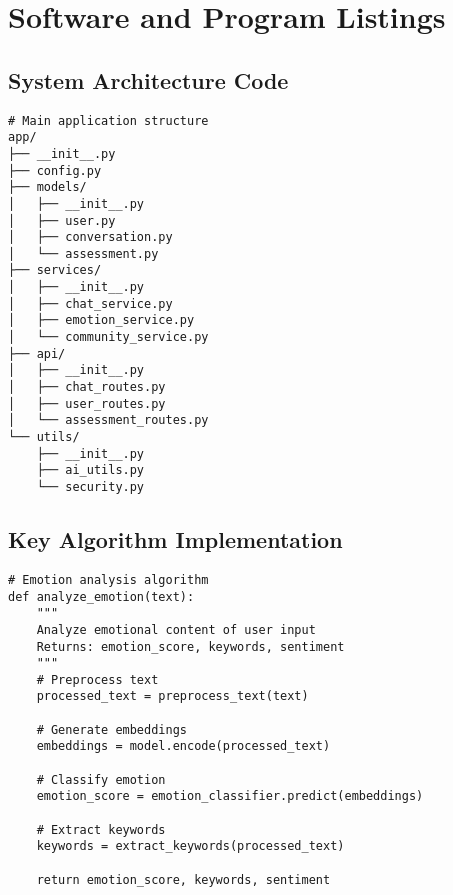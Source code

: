 \section{Software and Program Listings}
\label{sec:software}

\subsection{System Architecture Code}

\begin{verbatim}
# Main application structure
app/
├── __init__.py
├── config.py
├── models/
│   ├── __init__.py
│   ├── user.py
│   ├── conversation.py
│   └── assessment.py
├── services/
│   ├── __init__.py
│   ├── chat_service.py
│   ├── emotion_service.py
│   └── community_service.py
├── api/
│   ├── __init__.py
│   ├── chat_routes.py
│   ├── user_routes.py
│   └── assessment_routes.py
└── utils/
    ├── __init__.py
    ├── ai_utils.py
    └── security.py
\end{verbatim}

\subsection{Key Algorithm Implementation}

\begin{verbatim}
# Emotion analysis algorithm
def analyze_emotion(text):
    """
    Analyze emotional content of user input
    Returns: emotion_score, keywords, sentiment
    """
    # Preprocess text
    processed_text = preprocess_text(text)
    
    # Generate embeddings
    embeddings = model.encode(processed_text)
    
    # Classify emotion
    emotion_score = emotion_classifier.predict(embeddings)
    
    # Extract keywords
    keywords = extract_keywords(processed_text)
    
    return emotion_score, keywords, sentiment
\end{verbatim} 